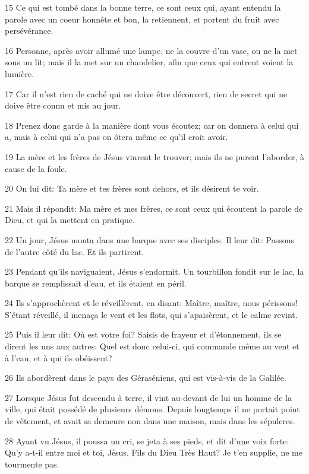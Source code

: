 \par 15 Ce qui est tombé dans la bonne terre, ce sont ceux qui, ayant entendu la parole avec un coeur honnête et bon, la retiennent, et portent du fruit avec persévérance.
\par 16 Personne, après avoir allumé une lampe, ne la couvre d'un vase, ou ne la met sous un lit; mais il la met sur un chandelier, afin que ceux qui entrent voient la lumière.
\par 17 Car il n'est rien de caché qui ne doive être découvert, rien de secret qui ne doive être connu et mis au jour.
\par 18 Prenez donc garde à la manière dont vous écoutez; car on donnera à celui qui a, mais à celui qui n'a pas on ôtera même ce qu'il croit avoir.
\par 19 La mère et les frères de Jésus vinrent le trouver; mais ils ne purent l'aborder, à cause de la foule.
\par 20 On lui dit: Ta mère et tes frères sont dehors, et ils désirent te voir.
\par 21 Mais il répondit: Ma mère et mes frères, ce sont ceux qui écoutent la parole de Dieu, et qui la mettent en pratique.
\par 22 Un jour, Jésus monta dans une barque avec ses disciples. Il leur dit: Passons de l'autre côté du lac. Et ils partirent.
\par 23 Pendant qu'ils naviguaient, Jésus s'endormit. Un tourbillon fondit sur le lac, la barque se remplissait d'eau, et ils étaient en péril.
\par 24 Ils s'approchèrent et le réveillèrent, en disant: Maître, maître, nous périssons! S'étant réveillé, il menaça le vent et les flots, qui s'apaisèrent, et le calme revint.
\par 25 Puis il leur dit: Où est votre foi? Saisis de frayeur et d'étonnement, ils se dirent les uns aux autres: Quel est donc celui-ci, qui commande même au vent et à l'eau, et à qui ils obéissent?
\par 26 Ils abordèrent dans le pays des Géraséniens, qui est vis-à-vis de la Galilée.
\par 27 Lorsque Jésus fut descendu à terre, il vint au-devant de lui un homme de la ville, qui était possédé de plusieurs démons. Depuis longtemps il ne portait point de vêtement, et avait sa demeure non dans une maison, mais dans les sépulcres.
\par 28 Ayant vu Jésus, il poussa un cri, se jeta à ses pieds, et dit d'une voix forte: Qu'y a-t-il entre moi et toi, Jésus, Fils du Dieu Très Haut? Je t'en supplie, ne me tourmente pas.

